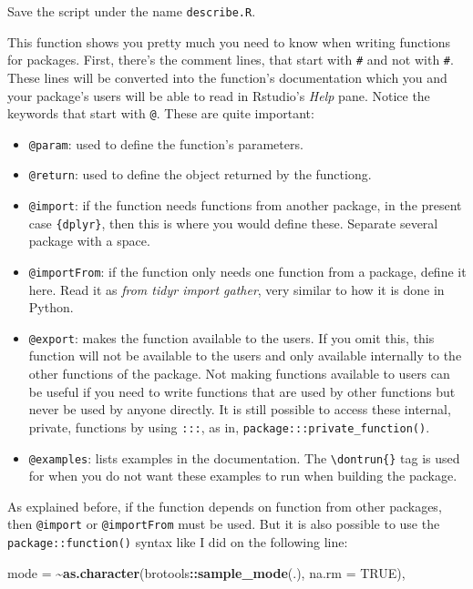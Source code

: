 \documentclass[
]{article}
\newenvironment{Shaded}{\begin{snugshade}}{\end{snugshade}}
\newcommand{\DataTypeTok}[1]{\textcolor[rgb]{0.13,0.29,0.53}{#1}}
\newcommand{\ErrorTok}[1]{\textcolor[rgb]{0.64,0.00,0.00}{\textbf{#1}}}
\newcommand{\KeywordTok}[1]{\textcolor[rgb]{0.13,0.29,0.53}{\textbf{#1}}}
\newcommand{\NormalTok}[1]{#1}
\newcommand{\OperatorTok}[1]{\textcolor[rgb]{0.81,0.36,0.00}{\textbf{#1}}}
\newcommand{\OtherTok}[1]{\textcolor[rgb]{0.56,0.35,0.01}{#1}}
\newcommand{\StringTok}[1]{\textcolor[rgb]{0.31,0.60,0.02}{#1}}
\providecommand{\tightlist}{%
  \setlength{\itemsep}{0pt}\setlength{\parskip}{0pt}}
\begin{document}
Save the script under the name \texttt{describe.R}.

This function shows you pretty much you need to know when writing functions for packages. First,
there's the comment lines, that start with \texttt{\#\textquotesingle{}} and not with \texttt{\#}. These lines will be converted
into the function's documentation which you and your package's users will be able to read in
Rstudio's \emph{Help} pane. Notice the keywords that start with \texttt{@}. These are quite important:

\begin{itemize}
\tightlist
\item
  \texttt{@param}: used to define the function's parameters.
\item
  \texttt{@return}: used to define the object returned by the functiong.
\item
  \texttt{@import}: if the function needs functions from another package, in the present case \texttt{\{dplyr\}},
  then this is where you would define these. Separate several package with a space.
\item
  \texttt{@importFrom}: if the function only needs one function from a package, define it here. Read it as
  \emph{from tidyr import gather}, very similar to how it is done in Python.
\item
  \texttt{@export}: makes the function available to the users. If you omit this, this function will not
  be available to the users and only available internally to the other functions of the package. Not
  making functions available to users can be useful if you need to write functions that are used by
  other functions but never be used by anyone directly. It is still possible to access these internal,
  private, functions by using \texttt{:::}, as in, \texttt{package:::private\_function()}.
\item
  \texttt{@examples}: lists examples in the documentation. The \texttt{\textbackslash{}dontrun\{\}} tag is used for when you do
  not want these examples to run when building the package.
\end{itemize}

As explained before, if the function depends on function from other packages, then \texttt{@import} or
\texttt{@importFrom} must be used. But it is also possible to use the \texttt{package::function()} syntax like
I did on the following line:

\begin{Shaded}
\begin{Highlighting}[]
\NormalTok{mode =}\StringTok{ }\ErrorTok{\textasciitilde{}}\KeywordTok{as.character}\NormalTok{(brotools}\OperatorTok{::}\KeywordTok{sample\_mode}\NormalTok{(.), }\DataTypeTok{na.rm =} \OtherTok{TRUE}\NormalTok{),}
\end{Highlighting}
\end{Shaded}
\end{document}
